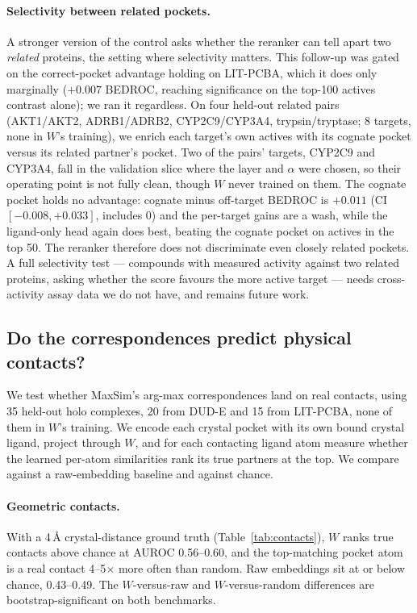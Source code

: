 \documentclass[10pt,letterpaper,twocolumn]{article}
\begin{document}
\paragraph{Selectivity between related pockets.} A stronger version of the control asks whether the reranker can tell apart two \emph{related} proteins, the setting where selectivity matters. This follow-up was gated on the correct-pocket advantage holding on LIT-PCBA, which it does only marginally ($+0.007$ BEDROC, reaching significance on the top-100 actives contrast alone); we ran it regardless. On four held-out related pairs (AKT1/AKT2, ADRB1/ADRB2, CYP2C9/CYP3A4, trypsin/tryptase; 8 targets, none in $W$'s training), we enrich each target's own actives with its cognate pocket versus its related partner's pocket. Two of the pairs' targets, CYP2C9 and CYP3A4, fall in the validation slice where the layer and $\alpha$ were chosen, so their operating point is not fully clean, though $W$ never trained on them. The cognate pocket holds no advantage: cognate minus off-target BEDROC is $+0.011$ (CI $[-0.008, +0.033]$, includes 0) and the per-target gains are a wash, while the ligand-only head again does best, beating the cognate pocket on actives in the top 50. The reranker therefore does not discriminate even closely related pockets. A full selectivity test --- compounds with measured activity against two related proteins, asking whether the score favours the more active target --- needs cross-activity assay data we do not have, and remains future work.

\subsection{Do the correspondences predict physical contacts?}
\label{sec:contacts}

We test whether MaxSim's arg-max correspondences land on real contacts, using 35 held-out holo complexes, 20 from DUD-E and 15 from LIT-PCBA, none of them in $W$'s training. We encode each crystal pocket with its own bound crystal ligand, project through $W$, and for each contacting ligand atom measure whether the learned per-atom similarities rank its true partners at the top. We compare against a raw-embedding baseline and against chance.

\paragraph{Geometric contacts.} With a 4\,\AA{} crystal-distance ground truth (Table~\ref{tab:contacts}), $W$ ranks true contacts above chance at AUROC 0.56--0.60, and the top-matching pocket atom is a real contact 4--5$\times$ more often than random. Raw embeddings sit at or below chance, 0.43--0.49. The $W$-versus-raw and $W$-versus-random differences are bootstrap-significant on both benchmarks.
\end{document}

